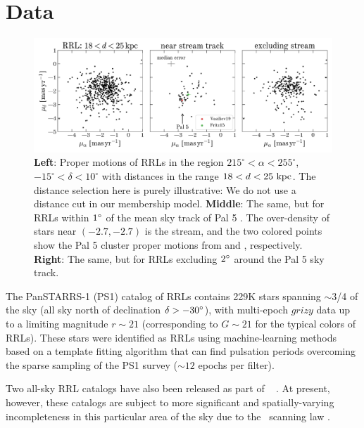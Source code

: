 \documentclass[twocolumn]{aastex63}
\begin{document}
\section{Data} \label{sec:data}

\begin{figure}[t!]
\begin{center}
\includegraphics[width=\textwidth]{proper-motion.pdf}
\caption{\textbf{Left}: Proper motions of RRLs in the region $215^\circ < \alpha < 255^\circ$, $-15^\circ < \delta < 10^\circ$ with distances in the range $18 < d < 25~\mathrm{kpc}$.
The distance selection here is purely illustrative: We do not use a distance cut in our membership model.
\textbf{Middle}: The same, but for RRLs within $1\mbox{$^\circ$}$ of the mean sky track of Pal 5 \citep{Bonaca:2019}.
The over-density of stars near $(-2.7, -2.7)$ is the stream, and the two colored points show the Pal 5 cluster proper motions from \citet{Vasiliev:2019} and \citet{Fritz:2015}, respectively.
\textbf{Right}: The same, but for RRLs excluding $2\mbox{$^\circ$}$ around the Pal 5 sky track.}
\label{fig:pm}
\end{center}
\end{figure}

The PanSTARRS-1 (PS1) catalog of RRLs \citep{Sesar:2017b} contains 229K stars spanning $\sim$3/4 of the sky (all sky north of declination $\delta > -30\mbox{$^\circ$}$), with multi-epoch $grizy$ data up to a limiting magnitude $r\sim21$ (corresponding to $G \sim 21$ for the typical colors of RRLs). These stars were identified as RRLs using machine-learning methods based on a template fitting algorithm that can find pulsation periods overcoming the sparse sampling of the PS1 survey ($\sim12$ epochs per filter).

Two all-sky RRL catalogs have also been released as part of \Gaia~ \citep[VariClassifier and Specific Object Studies][]{Holl2018, Rimoldini2018, Clementini2018}. At present, however, these catalogs are subject to more significant and spatially-varying incompleteness in this particular area of the sky due to the \Gaia\ scanning law \citep[see][though many of these issues will improve with future \Gaia\ data releases]{Rimoldini2018}.
\end{document}

